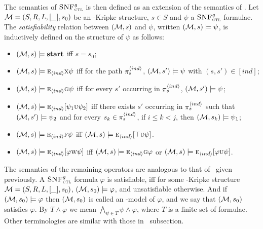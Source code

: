 \documentclass[letterpaper]{article} %
\begin{document}
The semantics of ${\textsc{SNF}_{\textsc{ctl}}^g}$ is then
defined as an extension of the semantics of \CTL. 
Let ${\cal M}=(S,R,L,[\_],s_0)$ be an \Ind-Kripke structure, $s\in S$ and $\psi$ a ${\textsc{SNF}_{\textsc{ctl}}^g}$ formulae.
The {\em satisfiability} relation between $({\cal M},s)$ and $\psi$,
written $({\cal M},s)\models\psi$, is inductively defined on the structure of $\psi$ as follows:
\begin{itemize}
  \item $({\cal M},s) \models \textbf{start}$ iff $s=s_0$;
  \item $({\cal M},s)\models \textsc{e}_{{\langle{ind}\rangle}} \textsc{x} \psi$ iff for the path $\pi_{s}^{{\langle{ind}\rangle}}$, $({\cal M}, s')\models \psi$ with $(s, s') \in [ind]$;
  \item $({\cal M},s)\models \textsc{e}_{{\langle{ind}\rangle}}\textsc{g}\psi$ iff
    for every $s'$ occurring in $\pi_{s}^{{\langle{ind}\rangle}}$,
    $({\cal M},s') \models \psi$;
  \item $({\cal M},s)\models \textsc{e}_{{\langle{ind}\rangle}}[\psi_1\textsc{u}\psi_2]$ iff
      there exists $s'$ occurring in $ \pi_{s}^{{\langle{ind}\rangle}}$ such that $({\cal M},s') \models \psi_2$ and for every $s_k \in \pi_{s}^{{\langle{ind}\rangle}}$, if $i\leq k < j$, then $({\cal M},s_k) \models \psi_1$;
  \item $({\cal M},s) \models \textsc{e}_{{\langle{ind}\rangle}} \textsc{f} \psi$ iff $({\cal M},s) \models \textsc{e}_{{\langle{ind}\rangle}}[\top \textsc{u}\psi]$.
  \item $({\cal M},s)\models \textsc{e}_{{\langle{ind}\rangle}}[\varphi\textsc{w}\psi]$ iff $({\cal M},s) \models \textsc{e}_{{\langle{ind}\rangle}}\textsc{g} \varphi$ or $({\cal M},s)\models \textsc{e}_{{\langle{ind}\rangle}}[\varphi\textsc{u}\psi]$.
\end{itemize}
The semantics of the remaining operators are analogous to that of \CTL\ given previously.
A ${\textsc{SNF}_{\textsc{ctl}}^g}$ formula $\varphi$ is satisfiable, iff for some \Ind-Kripke structure ${\cal M}=(S,R,L,[\_],s_0)$, $({\cal M},s_0)\models \varphi$, and unsatisfiable otherwise. And if $({\cal M},s_0)\models \varphi$ then $({\cal M},s_0)$ is called an \Ind-model of $\varphi$, and we say that $({\cal M},s_0)$ satisfies $\varphi$.
By $T \wedge \varphi$ we mean $\bigwedge_{\psi\in T} \psi \wedge \varphi$, where $T$ is a finite set of formulae.
Other terminologies are similar with those in \CTL\  subsection.
\end{document}
